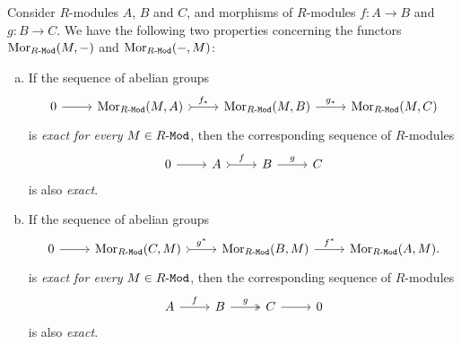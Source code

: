 \begin{proposition}
    \label{prop:hom-exact-then-sequence-exact}
    Consider \(R\)-modules \(A\), \(B\) and \(C\), and morphisms of
    \(R\)-modules \(f: A \to B\) and \(g: B \to C\). We have the following two
    properties concerning the functors \(\operatorname{Mor}_{{R\text{-}\texttt{Mod}}}(M, -)\) and
    \(\operatorname{Mor}_{{R\text{-}\texttt{Mod}}}(-, M)\):
    \begin{enumerate}[(a)]\setlength\itemsep{0em}
        \item If the sequence of abelian groups
              \[
                  \begin{tikzcd}
                      0 \ar[r] &\Hom_{\Mod{R}}(M, A) \ar[r, tail, "f_{*}"] &\Hom_{\Mod{R}}(M, B)
                      \ar[r, "g_{*}"] &\Hom_{\Mod{R}}(M, C)
                  \end{tikzcd}
              \]
              is \emph{exact for every} \(M \in {R\text{-}\texttt{Mod}}\), then the corresponding sequence
              of \(R\)-modules
              \[
                  \begin{tikzcd}
                      0 \ar[r] &A \ar[r, tail, "f"] &B \ar[r, "g"] &C
                  \end{tikzcd}
              \]
              is also \emph{exact}.

        \item If the sequence of abelian groups
              \[
                  \begin{tikzcd}
                      0 \ar[r] &\Hom_{\Mod{R}}(C, M) \ar[r, tail, "g^{*}"] &\Hom_{\Mod{R}}(B, M)
                      \ar[r, "f^{*}"] &\Hom_{\Mod{R}}(A, M).
                  \end{tikzcd}
              \]
              is \emph{exact for every} \(M \in {R\text{-}\texttt{Mod}}\), then the corresponding sequence
              of \(R\)-modules
              \[
                  \begin{tikzcd}
                      A \ar[r, "f"] &B \ar[r, two heads, "g"] &C \ar[r] &0
                  \end{tikzcd}
              \]
              is also \emph{exact}.
    \end{enumerate}
\end{proposition}

